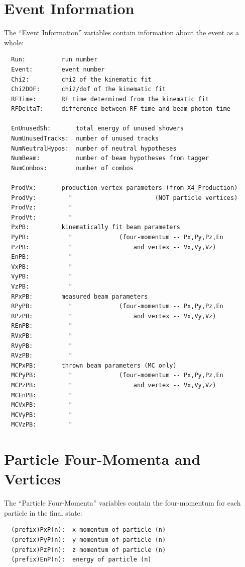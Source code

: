 \documentclass[11pt]{article}
\begin{document}
\section{Event Information}

The ``Event Information'' variables contain information about the event as a whole:

\begin{verbatim}
  Run:          run number
  Event:        event number
  Chi2:         chi2 of the kinematic fit
  Chi2DOF:      chi2/dof of the kinematic fit
  RFTime:       RF time determined from the kinematic fit
  RFDeltaT:     difference between RF time and beam photon time

  EnUnusedSh:       total energy of unused showers
  NumUnusedTracks:  number of unused tracks
  NumNeutralHypos:  number of neutral hypotheses
  NumBeam:          number of beam hypotheses from tagger
  NumCombos:        number of combos

  ProdVx:       production vertex parameters (from X4_Production)
  ProdVy:         "                       (NOT particle vertices)
  ProdVz:         "
  ProdVt:         "
  PxPB:         kinematically fit beam parameters
  PyPB:           "             (four-momentum -- Px,Py,Pz,En
  PzPB:           "                 and vertex -- Vx,Vy,Vz)
  EnPB:           "
  VxPB:           "
  VyPB:           "
  VzPB:           "
  RPxPB:        measured beam parameters
  RPyPB:          "             (four-momentum -- Px,Py,Pz,En
  RPzPB:          "                 and vertex -- Vx,Vy,Vz)
  REnPB:          "
  RVxPB:          "
  RVyPB:          "
  RVzPB:          "
  MCPxPB:       thrown beam parameters (MC only)
  MCPyPB:         "             (four-momentum -- Px,Py,Pz,En
  MCPzPB:         "                 and vertex -- Vx,Vy,Vz)
  MCEnPB:         "
  MCVxPB:         "
  MCVyPB:         "
  MCVzPB:         "
\end{verbatim}



\section{Particle Four-Momenta and Vertices}
\label{sec:nt:momentum}

The ``Particle Four-Momenta'' variables contain the four-momentum for each particle in the final state:

\begin{verbatim}
  (prefix)PxP(n):  x momentum of particle (n)
  (prefix)PyP(n):  y momentum of particle (n)
  (prefix)PzP(n):  z momentum of particle (n)
  (prefix)EnP(n):  energy of particle (n)
\end{verbatim}
\end{document}
